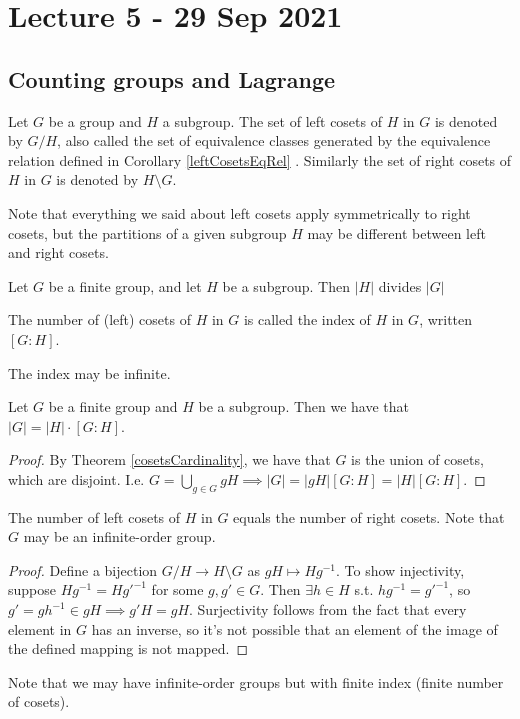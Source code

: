 \section{Lecture 5 - 29 Sep 2021}
\subsection{Counting groups and Lagrange}
\begin{definition}
  Let $G$ be a group and $H$ a subgroup. The set of left cosets of $H$ in $G$ is denoted
  by $G/H$, also called the set of equivalence classes generated by the equivalence
  relation defined in Corollary \ref{leftCosetsEqRel} . Similarly the set of right cosets of
  $H$ in $G$ is denoted by $H\setminus G$.
  \label{cosets}
\end{definition}
Note that everything we said about left cosets apply symmetrically to right cosets, but
the partitions of a given subgroup $H$ may be different between left and right cosets.

\begin{corollary}
  Let $G$ be a finite group, and let $H$ be a subgroup. Then $|H|$ divides $|G|$
\end{corollary}

\begin{definition}
  The number of (left) cosets of $H$ in $G$ is called the index of $H$ in $G$, written
  $[G:H]$.
\end{definition}
The index may be infinite.

\begin{corollary}
  Let $G$ be a finite group and $H$ be a subgroup. Then we have that $|G|=|H| \cdot [G:H]$.
  \label{lagrange}
\end{corollary}
\begin{proof}
  By Theorem \ref{cosetsCardinality}, we have that $G$ is the union of cosets, which are
  disjoint. I.e. $G=\bigcup_{g\in G} gH\implies |G|=|gH|[G:H]=|H|[G:H]$.
\end{proof}

\begin{theorem}
  The number of left cosets of $H$ in $G$ equals the number of right cosets. Note that $G$
  may be an infinite-order group.
\end{theorem}
\begin{proof}
  Define a bijection $G/H\to H\setminus G$ as $gH\mapsto Hg^{-1}$. To show injectivity,
  suppose $Hg^{-1}=Hg'^{-1}$ for some $g,g'\in G$. Then $\exists h\in H$ s.t.
  $hg^{-1} = g'^{-1}$, so $g' = gh^{-1}\in gH \implies g'H=gH$. Surjectivity follows from
  the fact that every element in $G$ has an inverse, so it's not possible that an element
  of the image of the defined mapping is not mapped.
\end{proof}
Note that we may have infinite-order groups but with finite index (finite number of
cosets).

